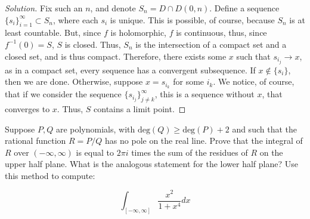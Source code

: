 \documentclass[10pt]{article}
\newenvironment{problem}[2][]{\begin{trivlist}
\item[\hskip \labelsep {\bfseries #1}\hskip \labelsep {\bfseries #2.}]}{\end{trivlist}}
\begin{document}
\begin{proof}[Solution]
Fix such an $n$, and denote $S_n = D \cap D(0,n)$. Define a sequence $\{ s_i \}_{i=1}^\infty\subset S_n$, where each $s_i$ is unique. This is possible, of course, because $S_n$ is at least countable. But, since $f$ is holomorphic, $f$ is continuous, thus, since $f^{-1}(0) = S$, $S$ is closed. Thus, $S_n$ is the intersection of a compact set and a closed set, and is thus compact. Therefore, there exists some $x$ such that $ s_{i_j} \to x$, as in a compact set, every sequence has a convergent subsequence. If $x \not \in \{ s_i \}$, then we are done. Otherwise, suppose $x = s_{i_k}$ for some $i_k$. We notice, of course, that if we consider the sequence $\{ s_{i_j} \}_{j \not = k}^\infty$, this is a sequence without $x$, that converges to $x$. Thus, $S$ contains a limit point.

\end{proof}

\begin{problem}{Question 2}

Suppose $P,Q$ are polynomials, with $\text{deg}(Q) \geq \text{deg}(P)  + 2$ and such that the rational function $R = P/Q$ has no pole on the real line. Prove that the integral of $R$ over $(-\infty,\infty)$ is equal to $2\pi i$ times the sum of the residues of $R$ on the upper half plane. What is the analogous statement for the lower half plane? Use this method to compute:

$$ \int_{[-\infty,\infty]} \frac{x^2}{1 + x^4} dx$$

\end{problem}
\end{document}
